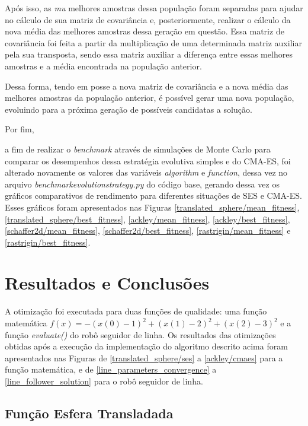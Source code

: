 \documentclass[conference]{IEEEtran}
\begin{document}
Após isso, as \textit{mu} melhores amostras dessa população foram separadas para ajudar no cálculo de sua matriz de covariância e, posteriormente, realizar o cálculo da nova média das melhores amostras dessa geração em questão. Essa matriz de covariância foi feita a partir da multiplicação de uma determinada matriz auxiliar pela sua transposta, sendo essa matriz auxiliar a diferença entre essas melhores amostras e a média encontrada na população anterior.

Dessa forma, tendo em posse a nova matriz de covariância e a nova média das melhores amostras da população anterior, é possível gerar uma nova população, evoluindo para a próxima geração de possíveis candidatas a solução.

Por fim, 

a fim de realizar o \textit{benchmark} através de simulações de Monte Carlo para comparar os desempenhos dessa estratégia evolutiva simples e do CMA-ES, foi alterado novamente os valores das variáveis \textit{algorithm} e \textit{function}, dessa vez no arquivo \textit{benchmark\underline{\space}evolution\underline{\space}strategy.py} do código base, gerando dessa vez os gráficos comparativos de rendimento para diferentes situações de SES e CMA-ES. Esses gráficos foram apresentados nas Figuras \ref{translated_sphere/mean_fitness}, \ref{translated_sphere/best_fitness}, \ref{ackley/mean_fitness}, \ref{ackley/best_fitness}, \ref{schaffer2d/mean_fitness}, \ref{schaffer2d/best_fitness}, \ref{rastrigin/mean_fitness} e \ref{rastrigin/best_fitness}.

\section{Resultados e Conclusões}
A otimização foi executada para duas funções de qualidade: uma função matemática $f\left ( x \right ) = - \left ( x\left ( 0 \right ) - 1 \right )^{2} + \left ( x\left ( 1 \right ) - 2 \right )^{2} + \left ( x\left ( 2 \right ) - 3 \right )^{2}$ e a função \textit{evaluate()} do robô seguidor de linha. Os resultados das otimizações obtidas após a execução da implementação do algoritmo descrito acima foram apresentados nas Figuras de \ref{translated_sphere/ses} a \ref{ackley/cmaes} para a função matemática, e de \ref{line_parameters_convergence} a \ref{line_follower_solution} para o robô seguidor de linha.

\subsection{Função Esfera Transladada}
\end{document}
